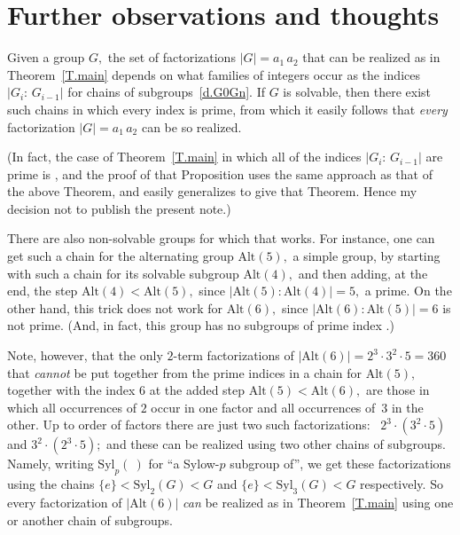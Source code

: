 \documentclass{amsart}
\numberwithin{equation}{section}
\numberwithin{theorem}{section}
\renewcommand{\r}{\mathrm}
\begin{document}
\section{Further observations and thoughts}\label{S.obs}

Given a group $G,$ the set of factorizations $|G| = a_1\,a_2$
that can be realized as in Theorem~\ref{T.main}
depends on what families of integers occur as the indices
$|G_i:\,G_{i-1}|$ for chains of subgroups~\eqref{d.G0Gn}.
If $G$ is solvable, then there exist such chains in
which every index is prime, from which it easily follows
that {\em every} factorization $|G| = a_1\,a_2$ can be so realized.

(In fact, the case of Theorem~\ref{T.main} in which all of the
indices $|G_i:\,G_{i-1}|$ are prime is \cite[Proposition~2]{BGV},
and the proof of that Proposition uses the same approach as
that of the above Theorem, and easily generalizes to give that Theorem.
Hence my decision not to publish the present note.)

There are also non-solvable groups for which that works.
For instance, one can get such a chain for the alternating group
$\r{Alt}(5),$ a simple group, by starting with such a chain for its
solvable subgroup $\r{Alt}(4),$ and then adding, at the end, the step
$\r{Alt}(4) < \r{Alt}(5),$ since $|\r{Alt}(5):\r{Alt}(4)| = 5,$
a prime.
On the other hand, this trick does not work for $\r{Alt}(6),$
since $|\r{Alt}(6):\r{Alt}(5)| = 6$ is not prime.
(And, in fact, this group has no subgroups of prime index
\cite[p.685, lines 5-7 after Proposition~2]{BGV}.)

Note, however, that the only $\!2\!$-term factorizations of
$|\r{Alt}(6)|=2^3\cdot 3^2\cdot 5 = 360$ that {\em cannot} be put
together from the prime indices in a chain for
$\r{Alt}(5),$ together with the index $6$ at the added step
$\r{Alt}(5) < \r{Alt}(6),$ are those in which all
occurrences of $2$ occur in one factor and all occurrences
of~$3$ in the other.
Up to order of factors there are just two
such factorizations: \ $2^3\cdot(3^2\cdot 5)$
and $3^2\cdot(2^3\cdot 5);$ and these can be realized using
two other chains of subgroups.
Namely, writing $\r{Syl}_p(\ )$ for ``a Sylow-$\!p\!$ subgroup of'',
we get these factorizations using the chains $\{e\} < \r{Syl}_2(G) < G$
and $\{e\} < \r{Syl}_3(G) < G$ respectively.
So every factorization of $|\r{Alt}(6)|$
{\em can} be realized as in Theorem~\ref{T.main} using one
or another chain of subgroups.
\end{document}
